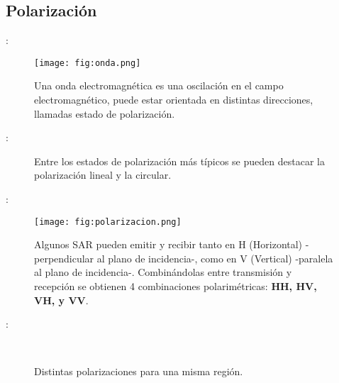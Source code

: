 \subsection{Polarización}

\begin{frame}{\secname : \subsecname}
  \begin{figure}
    \centering
    \texttt{[image: fig:onda.png]}
    \caption{Una onda electromagnética es una oscilación en el campo electromagnético, puede estar orientada en distintas direcciones, llamadas estado de polarización.}
    \label{}
  \end{figure}
\end{frame}

\begin{frame}{\secname : \subsecname}
  \begin{figure}
    \centering
    \caption{Entre los estados de polarización más típicos se pueden destacar la polarización lineal y la circular.}
    \label{}
  \end{figure}
\end{frame}



\begin{frame}{\secname : \subsecname}
  \begin{figure}
    \centering
    \texttt{[image: fig:polarizacion.png]}
    \caption{Algunos SAR pueden emitir y recibir tanto en H (Horizontal) -perpendicular al plano de incidencia-, como en V (Vertical) -paralela al plano de incidencia-. Combinándolas entre transmisión y recepción se obtienen 4 combinaciones polarimétricas: {\bf HH, HV, VH, y VV}.}
    \label{}
  \end{figure}
\end{frame}

\begin{frame}{\secname : \subsecname}
  \begin{figure}
    \centering
    \hspace{1cm}
    \\
    \hspace{1cm}
    \caption{Distintas polarizaciones para una misma región.}
  \end{figure}
\end{frame}

